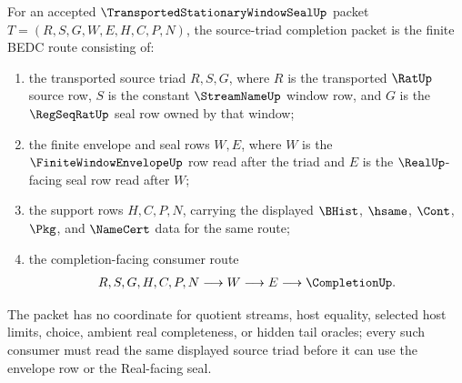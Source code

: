 \begin{definition}
\label{def:transported-stationary-window-seal-source-triad-completion-packet}
For an accepted $\TransportedStationaryWindowSealUp$ packet $T=(R,S,G,W,E,H,C,P,N)$, the source-triad completion packet is the finite BEDC route consisting of:
\begin{enumerate}
  \item the transported source triad $R,S,G$, where $R$ is the transported $\RatUp$ source row, $S$ is the constant $\StreamNameUp$ window row, and $G$ is the $\RegSeqRatUp$ seal row owned by that window;
  \item the finite envelope and seal rows $W,E$, where $W$ is the $\FiniteWindowEnvelopeUp$ row read after the triad and $E$ is the $\RealUp$-facing seal row read after $W$;
  \item the support rows $H,C,P,N$, carrying the displayed $\BHist$, $\hsame$, $\Cont$, $\Pkg$, and $\NameCert$ data for the same route;
  \item the completion-facing consumer route
  $$
  \begin{aligned}
    R,S,G,H,C,P,N
    \longrightarrow
    W
    \longrightarrow
    E
    \longrightarrow
    \CompletionUp .
  \end{aligned}
  $$
\end{enumerate}
The packet has no coordinate for quotient streams, host equality, selected host limits, choice, ambient real completeness, or hidden tail oracles; every such consumer must read the same displayed source triad before it can use the envelope row or the Real-facing seal.
\end{definition}

